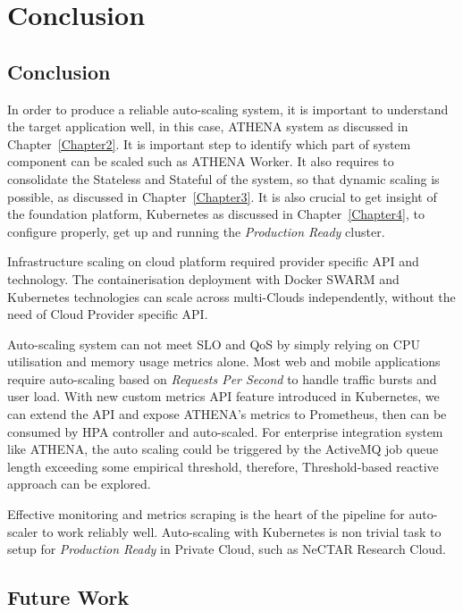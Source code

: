 \chapter{Conclusion}

\label{Chapter6}

\section{Conclusion}

In order to produce a reliable auto-scaling system, it is important to understand the target application well, in this case, ATHENA system as discussed in Chapter~\ref{Chapter2}. It is important step to identify which part of system component can be scaled such as ATHENA Worker. It also requires to consolidate the Stateless and Stateful of the system, so that dynamic scaling is possible, as discussed in Chapter~\ref{Chapter3}. It is also crucial to get insight of the foundation platform, Kubernetes as discussed in Chapter~\ref{Chapter4}, to configure properly, get up and running the \emph{Production Ready} cluster. 

Infrastructure scaling on cloud platform required provider specific API and technology. The containerisation deployment with Docker SWARM and Kubernetes technologies can scale across multi-Clouds independently, without the need of Cloud Provider specific API.

Auto-scaling system can not meet SLO and QoS by simply relying on CPU utilisation and memory usage metrics alone. Most web and mobile applications require auto-scaling based on \textit{Requests Per Second} to handle traffic bursts and user load. With new custom metrics API feature introduced in Kubernetes, we can extend the API and expose ATHENA's metrics to Prometheus, then can be consumed by HPA controller and auto-scaled. For enterprise integration system like ATHENA, the auto scaling could be triggered by the ActiveMQ job queue length exceeding some empirical threshold, therefore, Threshold-based reactive approach can be explored.

Effective monitoring and metrics scraping is the heart of the pipeline for auto-scaler to work reliably well. Auto-scaling with Kubernetes is non trivial task to setup for \emph{Production Ready} in Private Cloud, such as NeCTAR Research Cloud.


\section{Future Work}

